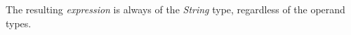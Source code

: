 The resulting \emph{expression} is always of the \emph{String} type,
regardless of the operand types.
